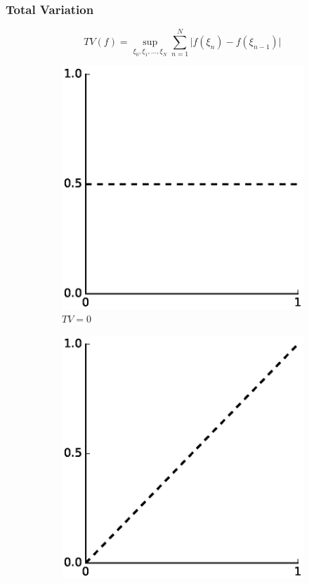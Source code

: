 \documentclass[11pt]{beamer}
\begin{document}
\begin{frame}
  \frametitle{Total Variation}
  \begin{equation*}
    TV(f) = \sup_{\xi_{0}, \xi_{1}, \dots, \xi_{N}} \sum_{n = 1}^{N} \big| f(\xi_{n}) - f(\xi_{n - 1}) \big|
  \end{equation*}
  \begin{figure}[h]
    \centering
    \begin{subfigure}{0.3\textwidth}
      \includegraphics[width=\textwidth]{figures/tv/constant}
      \caption{$TV = 0$}
    \end{subfigure}
    \begin{subfigure}{0.3\textwidth}
      \includegraphics[width=\textwidth]{figures/tv/linear}

\end{subfigure}
\end{figure}
\end{frame}
\end{document}
